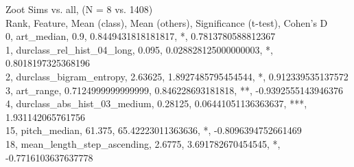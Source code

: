 Zoot Sims vs. all, (N = 8 vs. 1408)\\
Rank, Feature, Mean (class), Mean (others), Significance (t-test), Cohen's D\\
0, art_median, 0.9, 0.8449431818181817, *, 0.7813780588812367\\
1, durclass_rel_hist_04_long, 0.095, 0.028828125000000003, *, 0.8018197325368196\\
2, durclass_bigram_entropy, 2.63625, 1.8927485795454544, *, 0.912339535137572\\
3, art_range, 0.7124999999999999, 0.846228693181818, **, -0.9392555143946376\\
4, durclass_abs_hist_03_medium, 0.28125, 0.06441051136363637, ***, 1.931142065761756\\
15, pitch_median, 61.375, 65.42223011363636, *, -0.8096394752661469\\
18, mean_length_step_ascending, 2.6775, 3.691782670454545, *, -0.7716103637637778\\
